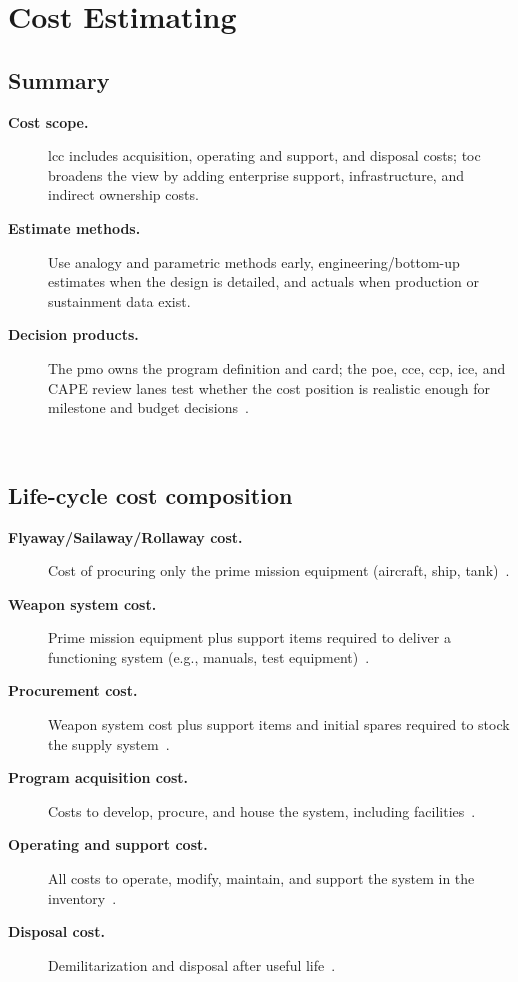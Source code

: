 \documentclass[../main.tex]{subfiles}
\begin{document}

\section{Cost Estimating}

\subsection{Summary}
\begin{description}
  \item[\textbf{Cost scope.}] \ac{lcc} includes acquisition, operating and support, and disposal costs; \ac{toc}
  broadens the view by adding enterprise support, infrastructure, and indirect ownership costs.
  \item[\textbf{Estimate methods.}] Use analogy and parametric methods early, engineering/bottom-up estimates when the
  design is detailed, and actuals when production or sustainment data exist.
  \item[\textbf{Decision products.}] The \ac{pmo} owns the program definition and \ac{card}; the \ac{poe}, \ac{cce},
  \ac{ccp}, \ac{ice}, and CAPE review lanes test whether the cost position is realistic enough for milestone and
  budget decisions~\autocite{DoDI5000-73-Cost-Analysis-2024}.
\end{description}
~

\subsection{Life-cycle cost composition}
\begin{description}
  \item[\textbf{Flyaway/Sailaway/Rollaway cost.}] Cost of procuring only the prime mission equipment (aircraft, ship, tank)~\autocite{edo-3-1-6-cost-estimating-2024}.
  \item[\textbf{Weapon system cost.}] Prime mission equipment plus support items required to deliver a functioning system (e.g., manuals, test equipment)~\autocite{edo-3-1-6-cost-estimating-2024}.
  \item[\textbf{Procurement cost.}] Weapon system cost plus support items and initial spares required to stock the supply system~\autocite{edo-3-1-6-cost-estimating-2024}.
  \item[\textbf{Program acquisition cost.}] Costs to develop, procure, and house the system, including facilities~\autocite{edo-3-1-6-cost-estimating-2024}.
  \item[\textbf{Operating and support cost.}] All costs to operate, modify, maintain, and support the system in the inventory~\autocite{edo-3-1-6-cost-estimating-2024}.
  \item[\textbf{Disposal cost.}] Demilitarization and disposal after useful life~\autocite{edo-3-1-6-cost-estimating-2024}.
\end{description}
\end{document}
